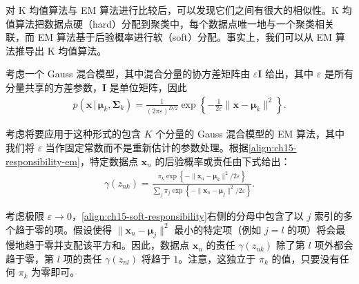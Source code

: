\documentclass[../../main.tex]{subfiles}
\begin{document}
对 K 均值算法与 EM 算法进行比较后，可以发现它们之间有很大的相似性。K 均值算法把数据点硬（hard）分配到聚类中，每个数据点唯一地与一个聚类相关联，而 EM 算法基于后验概率进行软（soft）分配。事实上，我们可以从 EM 算法推导出 K 均值算法。

考虑一个 Gauss 混合模型，其中混合分量的协方差矩阵由 $\varepsilon\bm{I}$ 给出，其中 $\varepsilon$ 是所有分量共享的方差参数，$\bm{I}$ 是单位矩阵，因此
\begin{align}
p(\bm{x}\,|\,\bm{\mu}_k,\bm{\Sigma}_k)=\frac{1}{(2\pi\varepsilon)^{D/2}}\exp\!\left\{-\frac{1}{2\varepsilon}\|\bm{x}-\bm{\mu}_k\|^{2}\right\}.
\label{align:ch15-isotropic}
\end{align}

考虑将要应用于这种形式的包含 $K$ 个分量的 Gauss 混合模型的 EM 算法，其中我们将 $\varepsilon$ 当作固定常数而不是重新估计的参数处理。根据\eqref{align:ch15-responsibility-em}，特定数据点 $\bm{x}_n$ 的后验概率或责任由下式给出：
\begin{align}
\gamma(z_{nk})=\frac{\pi_k\exp\!\left\{-\|\bm{x}_n-\bm{\mu}_k\|^{2}/2\varepsilon\right\}}{\sum_j\pi_j\exp\!\left\{-\|\bm{x}_n-\bm{\mu}_j\|^{2}/2\varepsilon\right\}}.
\label{align:ch15-soft-responsibility}
\end{align}

考虑极限 $\varepsilon\rightarrow0$，\eqref{align:ch15-soft-responsibility}右侧的分母中包含了以 $j$ 索引的多个趋于零的项。假设使得 $\|\bm{x}_n-\bm{\mu}_j\|^{2}$ 最小的特定项（例如 $j=l$ 的项）将会最慢地趋于零并支配该平方和。因此，数据点 $\bm{x}_n$ 的责任 $\gamma(z_{nk})$ 除了第 $l$ 项外都会趋于零，第 $l$ 项的责任 $\gamma(z_{nl})$ 将趋于 $1$。注意，这独立于 $\pi_k$ 的值，只要没有任何 $\pi_k$ 为零即可。
\end{document}
